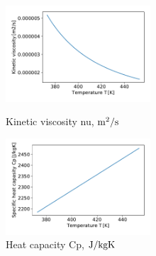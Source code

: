 \documentclass[conference]{IEEEtran}
\begin{document}
\begin{figure}[h]
\vspace{-1.5zh}
\begin{minipage}{0.48\linewidth}
 \includegraphics[width=0.48\textwidth,natwidth=200,natheight=220]{fig/kinetic_viscosity.pdf}
 \vspace{-1zh}
 \caption{Kinetic viscosity nu, $\rm m^{2}/s$}\label{kinetic_viscosity}
\end{minipage}
\hfill
\begin{minipage}{0.48\linewidth}
 \includegraphics[width=0.48\textwidth,natwidth=190,natheight=210]{fig/heat_capacity.pdf}
 \vspace{-1.5zh}
 \caption{Heat capacity Cp, $\rm J/kgK$}\label{heat_capacity}
\end{minipage}
\vspace{2zh}
\end{figure}
\end{document}
